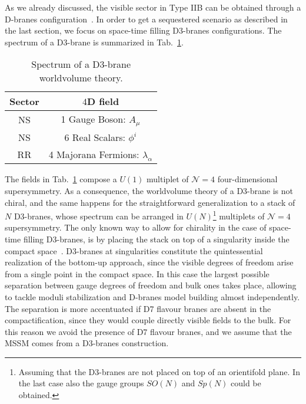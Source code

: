 \documentclass[12pt,a4paper]{book}
\begin{document}
As we already discussed, the visible sector in Type IIB can be obtained through a D-branes configuration~\cite{Maharana:2012tu}. In order to get a sequestered scenario as described in the last section, we focus on space-time filling D3-branes configurations. The spectrum of a D3-brane is summarized in Tab.~\ref{tab:D3Spectrum}. 
\begin{table}[h!]
\begin{center}
\begin{tabular}{cc}
\hline
Sector & $4$D field \\
\hline
NS & 1 Gauge Boson: $A_\mu$ \\
NS & 6 Real Scalars: $\phi^i$ \\
\hline
RR & 4 Majorana Fermions: $\lambda_\alpha$ \\
\hline
\end{tabular}
\end{center}
\caption{Spectrum of a D3-brane worldvolume theory.}
\label{tab:D3Spectrum}
\end{table}
The fields in Tab.~\ref{tab:D3Spectrum} compose a $U(1)$ multiplet of $\mathcal{N} = 4$ four-dimensional supersymmetry. As a consequence, the worldvolume theory of a D3-brane is not chiral, and the same happens for the straightforward generalization to a stack of $N$ D3-branes, whose spectrum can be arranged in $U(N)$\footnote{Assuming that the D3-branes are not placed on top of an orientifold plane. In the last case also the gauge groups $SO(N)$ and $Sp(N)$ could be obtained.} multiplets of $\mathcal{N} = 4$ supersymmetry. The only known way to allow for chirality in the case of space-time filling D3-branes, is by placing the stack on top of a singularity inside the compact space~\cite{Aldazabal:2000sa, Douglas:1996sw, Douglas:1997de, Kachru:1998ys, Lawrence:1998ja, Hanany:1998it}. D3-branes at singularities constitute the quintessential realization of the bottom-up approach, since the visible degrees of freedom arise from a single point in the compact space. In this case the largest possible separation between gauge degrees of freedom and bulk ones takes place, allowing to tackle moduli stabilization and D-branes model building almost independently. The separation is more accentuated if D7 flavour branes are absent in the compactification, since they would couple directly visible fields to the bulk. For this reason we avoid the presence of D7 flavour branes, and we assume that the MSSM comes from a D3-branes construction.\\
\end{document}

